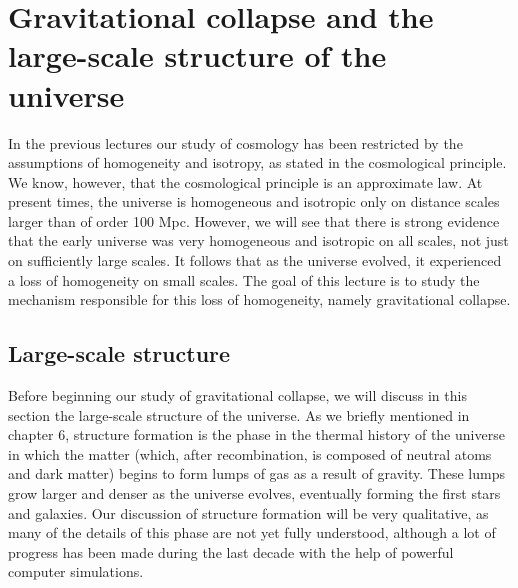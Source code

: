 \chapter{Gravitational collapse and the large-scale structure of the universe}

In the previous lectures our study of cosmology has been restricted by the assumptions of homogeneity and isotropy, as stated in the cosmological principle. We know, however, that the cosmological principle is an approximate law. At present times, the universe is homogeneous and isotropic only on distance scales larger than of order 100 Mpc. However, we will see that there is strong evidence that the early universe was very homogeneous and isotropic on all scales, not just on sufficiently large scales. It follows that as the universe evolved, it experienced a loss of homogeneity on small scales. The goal of this lecture is to study the mechanism responsible for this loss of homogeneity, namely gravitational collapse.

\section{Large-scale structure}

Before beginning our study of gravitational collapse, we will discuss in this section the large-scale structure of the universe. As we briefly mentioned in chapter 6, structure formation is the phase in the thermal history of the universe in which the matter (which, after recombination, is composed of neutral atoms and dark matter) begins to form lumps of gas as a result of gravity. These lumps grow larger and denser as the universe evolves, eventually forming the first stars and galaxies. Our discussion of structure formation will be very qualitative, as many of the details of this phase are not yet fully understood, although a lot of progress has been made during the last decade with the help of powerful computer simulations.

